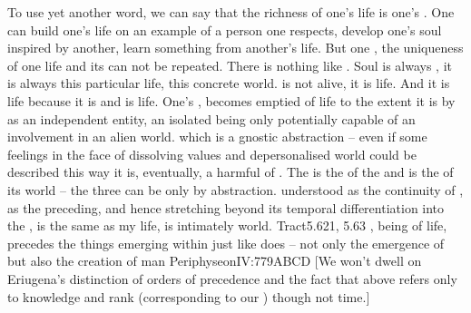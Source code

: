 \label{pa:worldislife1}
To use yet another word, we can say that the richness of {one's life} is one's
.  One can build {one's life} on an example of a person one respects,
develop one's soul inspired by another, learn something from another's life.
But one , the uniqueness of one life and its  can not be
repeated.  There is nothing like .  Soul is always
, it is always {this particular life}, this concrete {world}.
 is not alive, it is life.  And it is life because it is 
and  is life.  One's ,  becomes emptied of
life to the extent it is  by  as an independent
entity, an isolated being only potentially capable of an involvement in an alien
world.   which  is a gnostic abstraction
-- even if some feelings in the face of dissolving values and depersonalised
world could be described this way it is, eventually, a harmful  of
.  The  is the  of the 
and is the  of its world -- the three can be  only
by  abstraction.  understood as the continuity of
, as the  preceding, and hence stretching beyond its
temporal differentiation into the , is the same as {my
  life}, is intimately  world.  \citet{The world and life are one. I am
  my world.}{Tract}{5.621, 5.63} , being  of  life,
precedes the things emerging within  just like 
does -- not only the emergence of  but also the creation of man
\citet{is prior to those things which were created with it or in it or below
  it.}{Periphyseon}{IV:779ABCD [We won't dwell on Eriugena's
  distinction of orders of precedence and the fact that  above refers
  only to knowledge and rank (corresponding to our ) though not
  time.]}
%


